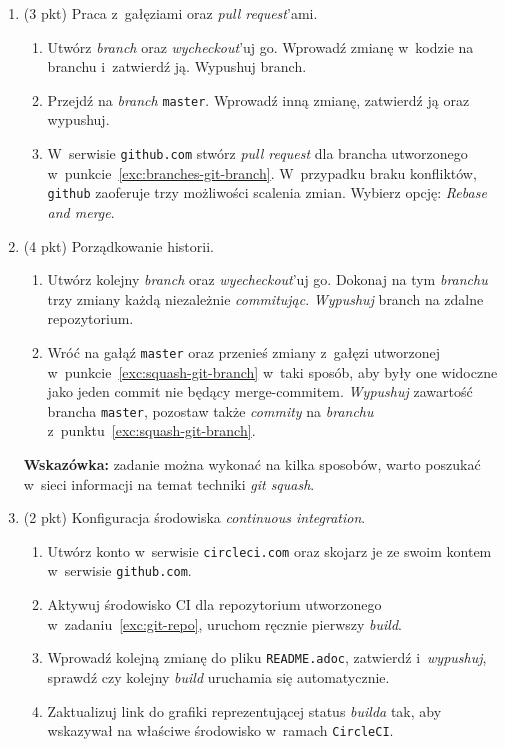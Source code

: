 \documentclass[12pt]{article}
\begin{document}
\begin{enumerate}
        \item\label{exc:branches}
            (3 pkt) Praca z~gałęziami oraz \textit{pull request}'ami.
            \begin{enumerate}
              \item \label{exc:branches-git-branch}Utwórz \textit{branch} oraz \textit{wycheckout}'uj go. Wprowadź zmianę w~kodzie na branchu i~zatwierdź ją. Wypushuj branch.
              \item Przejdź na \textit{branch} \texttt{master}. Wprowadź inną zmianę, zatwierdź ją oraz wypushuj.
              \item W~serwisie \texttt{github.com} stwórz \textit{pull request} dla brancha utworzonego w~punkcie~\ref{exc:branches-git-branch}. W~przypadku braku konfliktów, \texttt{github} zaoferuje trzy możliwości scalenia zmian. Wybierz opcję: \textit{Rebase and merge}.
            \end{enumerate}

        \item\label{exc:squash}
            (4 pkt) Porządkowanie historii.
            \begin{enumerate}
              \item \label{exc:squash-git-branch}Utwórz kolejny \textit{branch} oraz \textit{wyecheckout}'uj go. Dokonaj na tym \textit{branchu} trzy zmiany każdą niezależnie \textit{commitując}. \textit{Wypushuj} branch na zdalne repozytorium.
              \item Wróć na gałąź \texttt{master} oraz przenieś zmiany z~gałęzi utworzonej w~punkcie~\ref{exc:squash-git-branch} w~taki sposób, aby były one widoczne jako jeden commit nie będący merge-commitem. \textit{Wypushuj} zawartość brancha \texttt{master}, pozostaw także \textit{commity} na \textit{branchu} z~punktu~\ref{exc:squash-git-branch}.
            \end{enumerate}
            \textbf{Wskazówka:} zadanie można wykonać na kilka sposobów, warto poszukać w~sieci informacji na temat techniki \textit{git squash}.

        \item\label{exc:travis-ci}
            (2 pkt) Konfiguracja środowiska \textit{continuous integration}.
            \begin{enumerate}
              \item Utwórz konto w~serwisie \texttt{circleci.com} oraz skojarz je ze swoim kontem w~serwisie \texttt{github.com}.
              \item Aktywuj środowisko CI dla repozytorium utworzonego w~zadaniu~\ref{exc:git-repo}, uruchom ręcznie pierwszy \textit{build}.
              \item Wprowadź kolejną zmianę do pliku \texttt{README.adoc}, zatwierdź i~\textit{wypushuj}, sprawdź czy kolejny \textit{build} uruchamia się automatycznie.
              \item Zaktualizuj link do grafiki reprezentującej status \textit{builda} tak, aby wskazywał na właściwe środowisko w~ramach \texttt{CircleCI}.
            \end{enumerate}


\end{enumerate}
\end{document}
